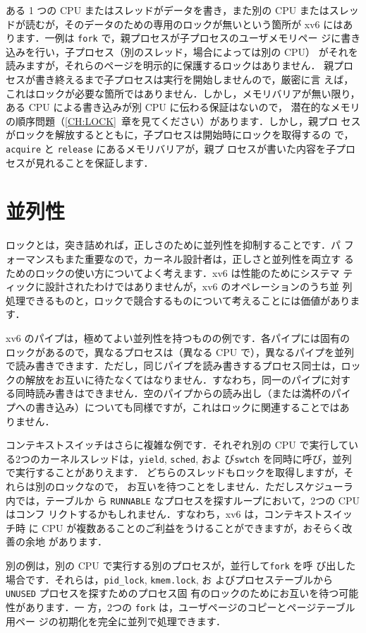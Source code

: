 ある 1 つの CPU またはスレッドがデータを書き，また別の CPU またはスレッ
ドが読むが，そのデータのための専用のロックが無いという箇所が xv6 にはあ
ります．一例は \texttt{fork} で，親プロセスが子プロセスのユーザメモリペー
ジに書き込みを行い，子プロセス（別のスレッド，場合によっては別の CPU）
がそれを読みますが，それらのページを明示的に保護するロックはありません．
親プロセスが書き終えるまで子プロセスは実行を開始しませんので，厳密に言
えば，これはロックが必要な箇所ではありません．しかし，メモリバリアが無い限り，
ある CPU による書き込みが別 CPU に伝わる保証はないので，
潜在的なメモリの順序問題（\ref{CH:LOCK}~章を見てください）があります．しかし，親プロ
セスがロックを解放するとともに，子プロセスは開始時にロックを取得するの
で，\texttt{acquire} と \texttt{release} にあるメモリバリアが，親プ
ロセスが書いた内容を子プロセスが見れることを保証します．

\section{並列性}

ロックとは，突き詰めれば，正しさのために並列性を抑制することです．パ
フォーマンスもまた重要なので，カーネル設計者は，正しさと並列性を両立す
るためのロックの使い方についてよく考えます．xv6 は性能のためにシステマ
ティックに設計されたわけではありませんが，xv6 のオペレーションのうち並
列処理できるものと，ロックで競合するものについて考えることには価値があります．

xv6 のパイプは，極めてよい並列性を持つものの例です．各パイプには固有の
ロックがあるので，異なるプロセスは（異なる CPU で），異なるパイプを並列
で読み書きできます．ただし，同じパイプを読み書きするプロセス同士は，ロッ
クの解放をお互いに待たなくてはなりません．すなわち，同一のパイプに対す
る同時読み書きはできません．空のパイプからの読み出し（または満杯のパイ
プへの書き込み）についても同様ですが，これはロックに関連することではあ
りません．

コンテキストスイッチはさらに複雑な例です．それぞれ別の CPU で実行してい
る2つのカーネルスレッドは，\texttt{yield}, \texttt{sched}, およ
び\texttt{swtch} を同時に呼び，並列で実行することがありえます．
どちらのスレッドもロックを取得しますが，それらは別のロックなので，
お互いを待つことをしません．ただしスケジューラ内では，テーブルか
ら \texttt{RUNNABLE} なプロセスを探すループにおいて，2つの CPU はコンフ
リクトするかもしれません．すなわち，xv6 は，コンテキストスイッチ時
に CPU が複数あることのご利益をうけることができますが，おそらく改善の余地
があります．

別の例は，別の CPU で実行する別のプロセスが，並行して\texttt{fork} を呼
び出した場合です．それらは，\texttt{pid\_lock}, \texttt{kmem.lock}, お
よびプロセステーブルから \texttt{UNUSED} プロセスを探すためのプロセス固
有のロックのためにお互いを待つ可能性があります．一
方，2つの \texttt{fork} は，ユーザページのコピーとページテーブル用ペー
ジの初期化を完全に並列で処理できます．

